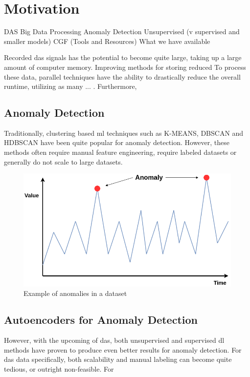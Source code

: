 \section{Motivation}

DAS
Big Data Processing
Anomaly Detection 
Unsupervised (v supervised and smaller models)
CGF (Tools and Resources)
What we have available

Recorded \acrshort{das} signals has the potential to become quite large, taking up a large amount of computer memory. Improving methods for storing reduced To process these data, parallel techniques have the ability to drastically reduce the overall runtime, utilizing as many ... . Furthermore, 


\subsection{Anomaly Detection}

Traditionally, clustering based \acrfull{ml} techniques such as K-MEANS, DBSCAN and HDBSCAN have been quite popular for anomaly detection. However, these methods often require manual feature engineering, require labeled datasets or generally do not scale to large datasets. 

\begin{figure}[ht]
    \centering
    \includegraphics[scale=0.4]{figures/anolay_line.png}
    \caption{Example of anomalies in a dataset}
    \label{fig:anomaly_example}
\end{figure}


\subsection{Autoencoders for Anomaly Detection}

However, with the upcoming of \acrshort{das}, both unsupervised and supervised \acrfull{dl} methods have proven to produce even better results for anomaly detection. For \acrshort{das} data specifically, both scalability and manual labeling can become quite tedious, or outright non-feasible. For 

